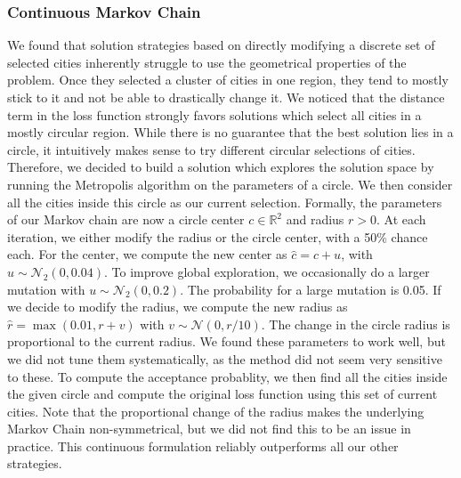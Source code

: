 \documentclass[conference,compsoc]{IEEEtran}
\begin{document}
\subsubsection{Continuous Markov Chain}
We found that solution strategies based on directly modifying a discrete set of
selected cities inherently struggle to use the geometrical properties of the
problem. Once they selected a cluster of cities in one region, they tend to
mostly stick to it and not be able to drastically change it. We noticed that the
distance term in the loss function strongly favors solutions which select all
cities in a mostly circular region. While there is no guarantee that the best
solution lies in a circle, it intuitively makes sense to try different circular
selections of cities. Therefore, we decided to build a solution which explores
the solution space by running the Metropolis algorithm on the parameters of a
circle. We then consider all the cities inside this circle as our current
selection. Formally, the parameters of our Markov chain are now a circle center
$c \in \mathbb{R}^2$ and radius $r > 0$. At each iteration, we either modify the
radius or the circle center, with a 50\% chance each. For the center, we compute
the new center as $\hat{c} = c + u$, with $u \sim \mathcal{N}_2(0, 0.04)$. To
improve global exploration, we occasionally do a larger mutation with $u \sim
\mathcal{N}_2(0, 0.2)$. The probability for a large mutation is 0.05. If we
decide to modify the radius, we compute the new radius as $\hat{r} = \max(0.01,
r + v)$ with $v \sim \mathcal{N}(0, r / 10)$. The change in the circle radius is
proportional to the current radius. We found these parameters to work well, but
we did not tune them systematically, as the method did not seem very sensitive
to these. To compute the acceptance probablity, we then find all the cities
inside the given circle and compute the original loss function using this set of
current cities. Note that the proportional change of the radius makes the
underlying Markov Chain non-symmetrical, but we did not find this to be an issue
in practice. This continuous formulation reliably outperforms all our other
strategies.

\end{document}
